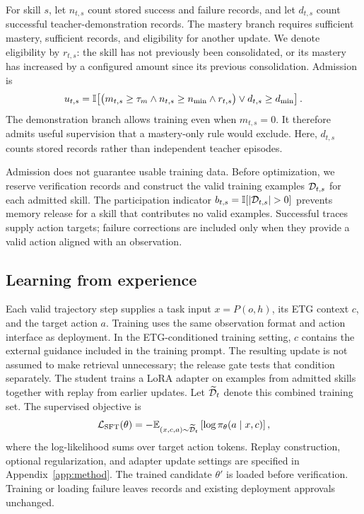 For skill $s$, let $n_{t,s}$ count stored success and failure records, and let $d_{t,s}$ count successful teacher-demonstration records. The mastery branch requires sufficient mastery, sufficient records, and eligibility for another update. We denote eligibility by $r_{t,s}$: the skill has not previously been consolidated, or its mastery has increased by a configured amount since its previous consolidation. Admission is
\begin{equation}
u_{t,s}=\mathbb{I}\!\left[
\bigl(m_{t,s}\geq\tau_m
\land n_{t,s}\geq n_{\min}
\land r_{t,s}\bigr)
\lor d_{t,s}\geq d_{\min}
\right].
\label{eq:ready}
\end{equation}
The demonstration branch allows training even when $m_{t,s}=0$. It therefore admits useful supervision that a mastery-only rule would exclude. Here, $d_{t,s}$ counts stored records rather than independent teacher episodes.

Admission does not guarantee usable training data. Before optimization, we reserve verification records and construct the valid training examples $\mathcal{D}_{t,s}$ for each admitted skill. The participation indicator $b_{t,s}=\ind[|\dataset_{t,s}|>0]$ prevents memory release for a skill that contributes no valid examples. Successful traces supply action targets; failure corrections are included only when they provide a valid action aligned with an observation.

\subsection{Learning from experience}
\label{sec:distill}

Each valid trajectory step supplies a task input $x=P(o,h)$, its ETG context $c$, and the target action $a$. Training uses the same observation format and action interface as deployment. In the ETG-conditioned training setting, $c$ contains the external guidance included in the training prompt. The resulting update is not assumed to make retrieval unnecessary; the release gate tests that condition separately. The student trains a LoRA adapter on examples from admitted skills together with replay from earlier updates. Let $\widetilde{\mathcal{D}}_t$ denote this combined training set. The supervised objective is
\begin{equation}
\mathcal{L}_{\mathrm{SFT}}(\theta)
=
-\mathbb{E}_{(x,c,a)\sim\widetilde{\mathcal{D}}_t}
\left[\log\pi_\theta(a\mid x,c)\right],
\label{eq:loss}
\end{equation}
where the log-likelihood sums over target action tokens. Replay construction, optional regularization, and adapter update settings are specified in Appendix~\ref{app:method}. The trained candidate $\theta'$ is loaded before verification. Training or loading failure leaves records and existing deployment approvals unchanged.

